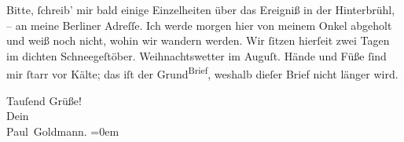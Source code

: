 \pstart
           Bitte,{ }ſchreib’ mir bald {\pb}einige Einzelheiten über
               das Ereigniß in der Hinterbrühl, – an meine Berliner Adreſſe. Ich werde morgen{ }hier von meinem Onkel abgeholt und weiß noch
               nicht, wohin wir wandern werden. Wir{ }ſitzen hierſeit zwei Tagen im dichten Schneegeſtöber.
               Weihnachtswetter im Auguſt. Hände und Füße{ }ſind mir{ }ſtarr vor Kälte; das iſt der \introOben{}Grund\introOben{}{ }\substVorne{}\textsuperscript{Brief}\substDazwischen{}\substHinten{}, weshalb  dieſer Brief nicht länger
               wird.\pend
           
\pstart
           {\pb}Tauſend Grüße! {\\[\baselineskip]}Dein {\\[\baselineskip]}\spacefill\mbox{Paul Goldmann.}\pend
           \leftskip=0em{}\endnumbering{}  \newcommand{\dateiname}{L03219}\newcommand{\titel}{Paul Goldmann an Arthur Schnitzler, 12. 8. [1902]}\newcommand{\editorInnen}{Martin Anton Müller und Laura Untner}
